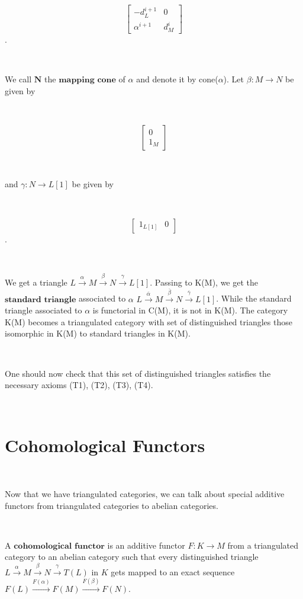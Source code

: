 \documentclass[12pt]{amsart}    %
\theoremstyle{definition}
\begin{document}
\

\[ \left[ \begin{array}{cc}
-d^{i+1}_L & 0  \\

\alpha^{i+1} & d^i_M  \end{array} \right]\] .

\

We call $\textbf{N}$ the $\textbf{mapping cone}$ of $\alpha$ and denote it by cone($\alpha$).  Let $\beta: M \rightarrow N$ be given by 

\

\[ \left[ \begin{array}{c}
0 \\

1_M  \end{array} \right]\] 

\

 and $\gamma: N \rightarrow L[1]$ be given by 
 
 \
 
\[ \left[ \begin{array}{cc}
1_{L[1]} & 0   \end{array} \right]\] .
 
 \
 
 We get a triangle $L \xrightarrow{\alpha} M \xrightarrow{\beta} N \xrightarrow{\gamma} L[1]$. Passing to K(M), we get the $\textbf{standard triangle}$ associated to $\alpha$ $L \xrightarrow{\overline{\alpha}} M \xrightarrow{\overline{\beta}} N \xrightarrow{\overline{\gamma}} L[1]$.  While the standard triangle associated to $\alpha$ is functorial in C(M), it is not in K(M).  The category K(M) becomes a triangulated category with set of distinguished triangles those isomorphic in K(M) to standard triangles in K(M).  

\

One should now check that this set of distinguished triangles satisfies the necessary axioms (T1), (T2), (T3), (T4).

\

\section{Cohomological Functors}

\

Now that we have triangulated categories, we can talk about special additive functors from triangulated categories to abelian categories.  

\

A $\textbf{cohomological functor}$ is an additive functor $F: K \rightarrow M$ from a triangulated category to an abelian category such that every distinguished triangle $L \xrightarrow{\alpha} M \xrightarrow{\beta} N \xrightarrow{\gamma} T(L)$ in $K$ gets mapped to an exact sequence $F(L) \xrightarrow{F(\alpha)} F(M) \xrightarrow{F(\beta)} F(N)$. 
\end{document}
